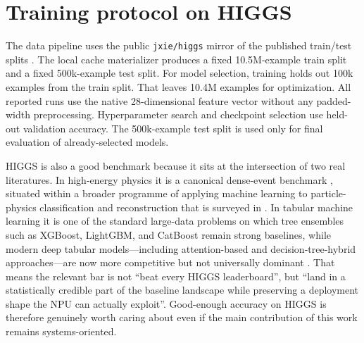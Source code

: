 \documentclass[a4paper,11pt]{article}
\newcommand{\code}[1]{\texttt{#1}}
\begin{document}
\section{Training protocol on HIGGS}

The data pipeline uses the public \code{jxie/higgs} mirror of the published
train/test splits \cite{jxie-higgs}. The local cache materializer produces a
fixed 10.5M-example train split and a fixed 500k-example test split. For model
selection, training holds out 100k examples from the train split. That leaves
10.4M examples for optimization. All reported runs use the native
28-dimensional feature vector without any padded-width preprocessing.
Hyperparameter search and checkpoint selection use held-out validation
accuracy. The 500k-example test split is used only for final evaluation of
already-selected models.

HIGGS is also a good benchmark because it sits at the intersection of two real
literatures. In high-energy physics it is a canonical dense-event benchmark
\cite{baldi-higgs}, situated within a broader programme of applying machine
learning to particle-physics classification and reconstruction that is
surveyed in \cite{ml4hep-review}. In tabular machine learning it is one of the standard
large-data problems on which tree ensembles such as XGBoost, LightGBM, and
CatBoost remain strong baselines, while modern deep tabular models---including
attention-based and decision-tree-hybrid approaches---are now more
competitive but not universally dominant \cite{xgboost-kdd,lightgbm-nips,catboost-paper,rtdl-revisiting,grinsztajn-tabular,tabnet,node-paper}.
That means the relevant bar is not ``beat every HIGGS leaderboard'', but
``land in a statistically credible part of the baseline landscape while
preserving a deployment shape the NPU can actually exploit''. Good-enough
accuracy on HIGGS is therefore genuinely worth caring about even if the main
contribution of this work remains systems-oriented.
\end{document}
